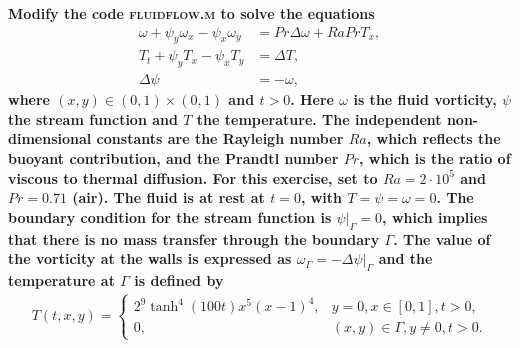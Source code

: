 \textbf{Modify the code \textsc{fluidflow.m} to solve the equations 
\begin{align*}
\omega+\psi_y\omega_x-\psi_x\omega_y &= Pr\Delta\omega+RaPrT_x,\\
T_t+\psi_yT_x-\psi_xT_y &= \Delta T,\\
\Delta\psi &= -\omega,
\end{align*}
where $(x,y)\in (0,1)\times (0,1)$ and $t>0$. Here $\omega$ is the fluid vorticity, $\psi$ the stream function and $T$ the temperature. The independent non-dimensional constants are the Rayleigh number $Ra$, which reflects the buoyant contribution, and the Prandtl number $Pr$, which is the ratio of viscous to thermal diffusion. For this exercise, set to $Ra = 2\cdot 10^5$ and $Pr=0.71$ (air). The fluid is at rest at $t= 0$, with $T=\psi=\omega= 0$. The boundary condition for the stream function is $\left.\psi\right|_{\Gamma}=0$, which implies that there is no mass transfer through the boundary $\Gamma$. The value of the vorticity at the walls is expressed as $\omega_{\Gamma}=-\left.\Delta\psi\right|_{\Gamma}$ and the temperature at $\Gamma$ is defined by
\begin{align*}
T(t,x,y) = 
\begin{cases}
       2^9\tanh^4(100t)x^5(x-1)^4,&  y=0, x\in [0,1], t>0,\\
       0,& (x,y)\in\Gamma, y\neq 0, t>0.
\end{cases}
\end{align*}
}
\newline
